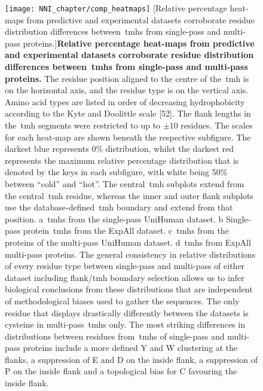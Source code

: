 \begin{figure}[p]
\centering
\texttt{[image: NNI\_chapter/comp\_heatmaps]}
[Relative percentage heat-maps from predictive and experimental datasets corroborate residue distribution differences between~\gls{tmh}s from single-pass and multi-pass proteins.]{\textbf{Relative percentage heat-maps from predictive and experimental datasets corroborate residue distribution differences between~\gls{tmh}s from single-pass and multi-pass proteins.}
The residue position aligned to the centre of the~\gls{tmh} is on the horizontal axis, and the residue type is on the vertical axis.
Amino acid types are listed in order of decreasing hydrophobicity according to the Kyte and Doolittle scale [52].
The flank lengths in the~\gls{tmh} segments were restricted to up to $\pm$10 residues.
The scales for each heat-map are shown beneath the respective subfigure.
The darkest blue represents 0\% distribution, whilst the darkest red represents the maximum relative percentage distribution that is denoted by the keys in each subfigure, with white being 50\% between ``cold'' and ``hot''.
The central~\gls{tmh} subplots extend from the central~\gls{tmh} residue, whereas the inner and outer flank subplots use the database-defined~\gls{tmh} boundary and extend from that position.
a~\gls{tmh}s from the single-pass UniHuman dataset.
b Single-pass protein~\gls{tmh}s from the ExpAll dataset.
c~\gls{tmh}s from the proteins of the multi-pass UniHuman dataset.
d~\gls{tmh}s from ExpAll multi-pass proteins.
The general consistency in relative distributions of every residue type between single-pass and multi-pass of either dataset including flank/\gls{tmh} boundary selection allows us to infer biological conclusions from these distributions that are independent of methodological biases used to gather the sequences.
The only residue that displays drastically differently between the datasets is cysteine in multi-pass~\gls{tmh}s only.
The most striking differences in distributions between residues from~\gls{tmh}s of single-pass and multi-pass proteins include a more defined Y and W clustering at the flanks, a suppression of E and D on the inside flank, a suppression of P on the inside flank and a topological bias for C favouring the inside flank.}

\label{fig:comp_heatmaps}
\end{figure}

